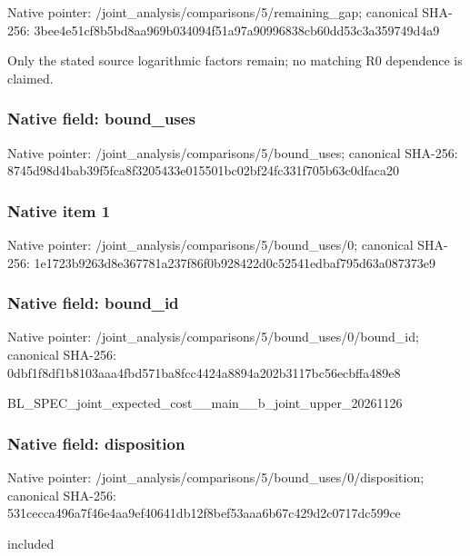 \documentclass[10pt,a4paper]{article}
\begin{document}
Native pointer: /joint\_analysis/comparis\allowbreak{}ons/5/remaining\_gap; canonical SHA-256: 3bee4e51cf8b5bd8aa969b03\allowbreak{}4094f51a97a90996838cb60d\allowbreak{}d53c3a359749d4a9


Only the stated source logarithmic factors remain; no matching R0 dependence is claimed.


\subsubsection{Native field: bound\_uses}


Native pointer: /joint\_analysis/comparis\allowbreak{}ons/5/bound\_uses; canonical SHA-256: 8745d98d4bab39f5fca8f320\allowbreak{}5433e015501bc02bf24fc331\allowbreak{}f705b63c0dfaca20



\subsubsection{Native item 1}


Native pointer: /joint\_analysis/comparis\allowbreak{}ons/5/bound\_uses/0; canonical SHA-256: 1e1723b9263d8e367781a237\allowbreak{}f86f0b928422d0c52541edba\allowbreak{}f795d63a087373e9



\subsubsection{Native field: bound\_id}


Native pointer: /joint\_analysis/comparis\allowbreak{}ons/5/bound\_uses/0/bound\allowbreak{}\_id; canonical SHA-256: 0dbf1f8df1b8103aaa4fbd57\allowbreak{}1ba8fcc4424a8894a202b311\allowbreak{}7bc56ecbffa489e8


BL\_SPEC\_joint\_expected\_c\allowbreak{}ost\_\_main\_\_b\_joint\_upper\allowbreak{}\_20261126


\subsubsection{Native field: disposition}


Native pointer: /joint\_analysis/comparis\allowbreak{}ons/5/bound\_uses/0/dispo\allowbreak{}sition; canonical SHA-256: 531cecca496a7f46e4aa9ef4\allowbreak{}0641db12f8bef53aaa6b67c4\allowbreak{}29d2c0717dc599ce


included
\end{document}
